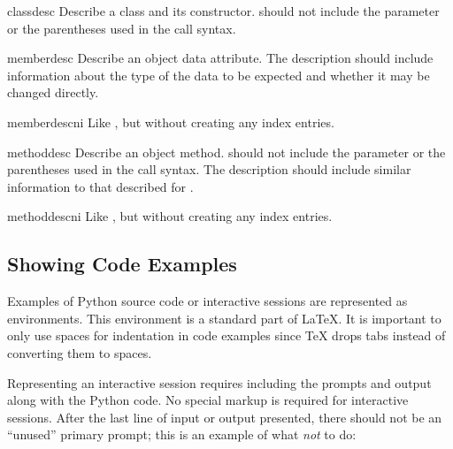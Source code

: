 \documentclass{howto}
\begin{document}
    \begin{envdesc}{classdesc}{}
      Describe a class and its constructor.   should not include the  parameter or
      the parentheses used in the call syntax.
    \end{envdesc}

    \begin{envdesc}{memberdesc}{}
      Describe an object data attribute.  The description should
      include information about the type of the data to be expected
      and whether it may be changed directly.
    \end{envdesc}
    \begin{envdesc}{memberdescni}{}
      Like , but without creating any index entries.
    \end{envdesc}

    \begin{envdesc}{methoddesc}{}
      Describe an object method.   should not include
      the  parameter or the parentheses used in the call
      syntax.  The description should include similar information to
      that described for .
    \end{envdesc}
    \begin{envdesc}{methoddescni}{}
      Like , but without creating any index entries.
    \end{envdesc}


  \subsection{Showing Code Examples}

    Examples of Python source code or interactive sessions are
    represented as  environments.  This environment
    is a standard part of \LaTeX{}.  It is important to only use
    spaces for indentation in code examples since \TeX{} drops tabs
    instead of converting them to spaces.

    Representing an interactive session requires including the prompts
    and output along with the Python code.  No special markup is
    required for interactive sessions.  After the last line of input
    or output presented, there should not be an ``unused'' primary
    prompt; this is an example of what \emph{not} to do:
\end{document}
